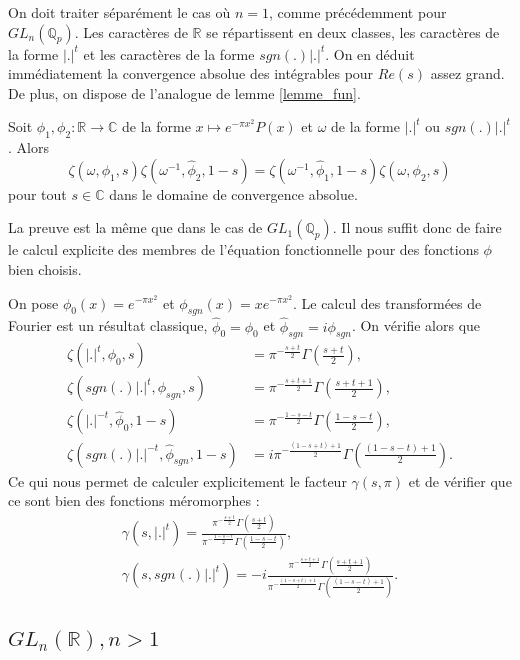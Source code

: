 On doit traiter séparément le cas où $n=1$, comme précédemment pour $GL_n(\mathbb{Q}_p)$. Les caractères de $\mathbb{R}$ se répartissent en deux classes, les caractères de la forme $|.|^t$ et les caractères de la forme $sgn(.)|.|^t$. On en déduit immédiatement la convergence absolue des intégrables pour $Re(s)$ assez grand. De plus, on dispose de l'analogue de lemme \ref{lemme_fun}.
\begin{lemme}
Soit $\phi_1, \phi_2 : \mathbb{R} \rightarrow \mathbb{C}$ de la forme $x \mapsto e^{-\pi x^2}P(x)$ et $\omega$ de la forme $|.|^t$ ou $sgn(.)|.|^t$. Alors
\begin{equation}
\zeta(\omega, \phi_1, s)\zeta(\omega^{-1}, \hat{\phi}_2, 1-s)=\zeta(\omega^{-1}, \hat{\phi}_1, 1-s)\zeta(\omega, \phi_2, s)
\end{equation}
pour tout $s \in \mathbb{C}$ dans le domaine de convergence absolue.
\end{lemme}
La preuve est la même que dans le cas de $GL_1(\mathbb{Q}_p)$. Il nous suffit donc de faire le calcul explicite des membres de l'équation fonctionnelle pour des fonctions $\phi$ bien choisis.

On pose $\phi_0(x) = e^{-\pi x^2}$ et $\phi_{sgn}(x)=xe^{-\pi x^2}$. Le calcul des transformées de Fourier est un résultat classique, $\hat{\phi}_0 = \phi_0$ et $\hat{\phi}_{sgn} = i\phi_{sgn}$. On vérifie alors que
\begin{align}
\zeta(|.|^t, \phi_0, s) &= \pi^{-\frac{s+t}{2}}\Gamma(\frac{s+t}{2}), \\
\zeta(sgn(.)|.|^t, \phi_{sgn}, s) &= \pi^{-\frac{s+t+1}{2}}\Gamma(\frac{s+t+1}{2}), \\
\zeta(|.|^{-t}, \hat{\phi}_0, 1-s) &= \pi^{-\frac{1-s-t}{2}}\Gamma(\frac{1-s-t}{2}), \\
\zeta(sgn(.)|.|^{-t}, \hat{\phi}_{sgn}, 1-s) &= i\pi^{-\frac{(1-s+t)+1}{2}}\Gamma(\frac{(1-s-t)+1}{2}).
\end{align}
Ce qui nous permet de calculer explicitement le facteur $\gamma(s,\pi)$ et de vérifier que ce sont bien des fonctions méromorphes :
\begin{align}
\gamma(s, |.|^t) = \frac{\pi^{-\frac{s+t}{2}}\Gamma(\frac{s+t}{2})}{\pi^{-\frac{1-s-t}{2}}\Gamma(\frac{1-s-t}{2})}, \\
\gamma(s, sgn(.)|.|^t) = -i\frac{\pi^{-\frac{s+t+1}{2}}\Gamma(\frac{s+t+1}{2})}{\pi^{-\frac{(1-s+t)+1}{2}}\Gamma(\frac{(1-s-t)+1}{2})}.
\end{align}

\subsection{$GL_n(\mathbb{R}), n > 1$}

